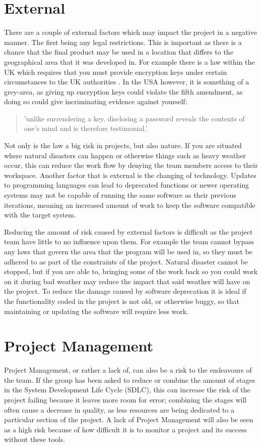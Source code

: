 \section{External}
There are a couple of external factors which may impact the project in a
negative manner.  The first being any legal restrictions. This is important as
there is a chance that the final product may be used in a location that differs
to the geographical area that it was developed in. For example there is a law
within the UK which requires that you must provide encryption keys under certain
circumstances to the UK authorities \cite{ripaIII}\cite{ukCryptLaw}. In the USA
however, it is something of a grey-area, as giving up encryption keys could
violate the fifth amendment, as doing so could give incriminating evidence
against yourself:

\begin{quote}
'unlike surrendering a key, disclosing a password reveals the contents of one’s mind and
is therefore testimonial.' \cite{usCryptLaw}
\end{quote}

Not only is the law a big risk in projects, but also nature. If you are
situated where natural disasters can happen or otherwise things such as heavy
weather occur, this can reduce the work flow by denying the team members access
to their workspace. Another factor that is external is the changing of
technology. Updates to programming languages can lead to deprecated functions
or newer operating systems may not be capable of running the same software as
their previous iterations, meaning an increased amount of work to keep the
software compatible with the target system.

Reducing the amount of risk caused by external factors is difficult as the
project team have little to no influence upon them. For example the team cannot
bypass any laws that govern the area that the program will be used in, so they
must be adhered to as part of the constraints of the project. Natural disaster
cannot be stopped, but if you are able to, bringing some of the work back so you
could work on it during bad weather may reduce the impact that said weather will
have on the project. To reduce the damage caused by software deprecation it is
ideal if the functionality coded in the project is not old, or otherwise buggy,
so that maintaining or updating the software will require less work.

\section{Project Management}
Project Management, or rather a lack of, can also be a risk to the endeavours of
the team. If the group has been asked to reduce or combine the amount of stages
in the System Development Life Cycle (SDLC), this can increase the risk of the
project failing because it leaves more room for error; combining the stages
will often cause a decrease in quality, as less resources are being dedicated to
a particular section of the project. A lack of Project Management will also be
seen as a high risk because of how difficult it is to monitor a project and its
success without these tools.

